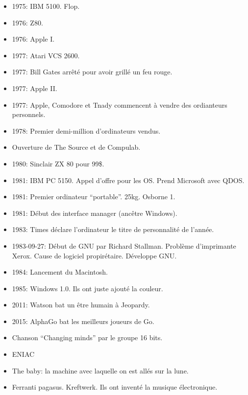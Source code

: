 \documentclass[a4paper,11pt]{article}
\begin{document}
\begin{itemize}
\item 1975: IBM 5100. Flop.

\item 1976: Z80.

\item 1976: Apple I.

\item 1977: Atari VCS 2600.

\item 1977: Bill Gates arrêté pour avoir grillé un feu rouge.

\item 1977: Apple II.

\item 1977: Apple, Comodore et Tnady commencent à vendre des ordianteurs
  personnels.

\item 1978: Premier demi-million d'ordinateurs vendus.

\item Ouverture de The Source et de Compulab.

\item 1980: Sinclair ZX 80 pour 99\$.

\item 1981: IBM PC 5150. Appel d'offre pour les OS. Prend Microsoft avec QDOS.

\item 1981: Premier ordinateur ``portable''. 25kg. Osborne 1.

\item 1981: Début des interface manager (ancêtre Windows).

\item 1983: Times déclare l'ordinateur le titre de personnalité de l'année.

\item 1983-09-27: Début de GNU par Richard Stallman. Problème d'imprimante Xerox.
  Cause de logiciel propirétaire. Développe GNU.

\item 1984: Lancement du Macintosh.

\item 1985: Windows 1.0. Ils ont juste ajouté la couleur.

\item 2011: Watson bat un être humain à Jeopardy.

\item 2015: AlphaGo bat les meilleurs joueurs de Go.

\item Chanson ``Changing minds'' par le groupe 16 bits.

\item ENIAC

\item The baby: la machine avec laquelle on est allés sur la lune.

\item Ferranti pagasus. Kreftwerk. Ils ont inventé la musique électronique.

\end{itemize}
\end{document}
